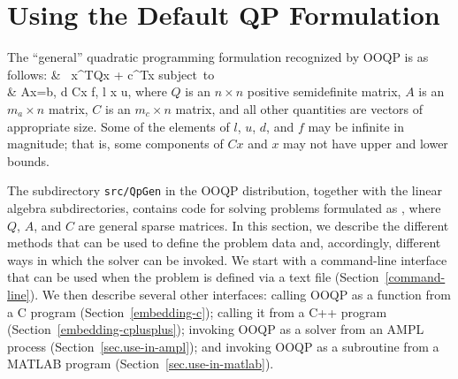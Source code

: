 \newenvironment{parameters}[2]%
        {%
         \begin{list}%
          {$\bullet$}%
          {\itemsep 2pt plus 1pt minus 1pt
                \topsep 2pt plus 1pt minus 1pt 
                \settowidth{\labelwidth}{#1}
                \settowidth{\leftmargin}{#1}
                \addtolength{\leftmargin}{\labelsep}}
           #2}%
        {\end{list}}
\def\parm#1{\item[\tt#1\hfill]}

\section{Using the Default QP Formulation}
\label{using-qpgen}

The ``general'' quadratic programming formulation recognized by OOQP
is as follows:
\beqa \label{qpgen}
& \min \, \half x^TQx + c^Tx \;\; \mbox{subject to} \\
\nonumber & Ax=b, \;\;\; d \le Cx \le f, \;\;\; l \le x \le u, \eeqa
where $Q$ is an $n \times n$ positive semidefinite matrix, $A$ is an
$m_a \times n$ matrix, $C$ is an $m_c \times n$ matrix, and all other
quantities are vectors of appropriate size. Some of the elements of
$l$, $u$, $d$, and $f$ may be infinite in magnitude; that is, some
components of $Cx$ and $x$ may not have upper and lower bounds.

The subdirectory {\tt src/QpGen} in the OOQP distribution, together
with the linear algebra subdirectories, contains code for solving
problems formulated as , where $Q$, $A$, and $C$ are
general sparse matrices.  In this section, we describe the different
methods that can be used to define the problem data and, accordingly,
different ways in which the solver can be invoked. We start with a
command-line interface that can be used when the problem is defined
via a text file (Section~\ref{command-line}). We then describe several
other interfaces: calling OOQP as a function from a C program
(Section~\ref{embedding-c}); calling it from a C++ program
(Section~\ref{embedding-cplusplus}); invoking OOQP as a solver from an
AMPL process (Section~\ref{sec.use-in-ampl}); and invoking OOQP as a
subroutine from a MATLAB program (Section~\ref{sec.use-in-matlab}).

